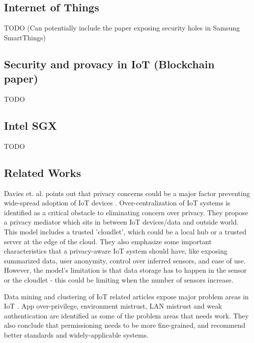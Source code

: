 \subsection{Internet of Things}
TODO
(Can potentially include the paper exposing security holes in Samsung SmartThings)

\subsection{Security and provacy in IoT (Blockchain paper)}
TODO

\subsection{Intel SGX}
TODO

\subsection{Related Works}
Davies et. al. points out that privacy concerns could be a major factor preventing wide-spread adoption of IoT devices \cite{davies}. Over-centralization of IoT systems is identified as a critical obstacle to eliminating concern over privacy. They propose a privacy mediator which sits in between IoT devices/data and outside world. This model includes a trusted 'cloudlet', which could be a local hub or a trusted server at the edge of the cloud. They also emphasize some important characteristics that a privacy-aware IoT system should have, like exposing summarized data, user anonymity, control over inferred sensors, and ease of use. However, the model's limitation is that data storage has to happen in the sensor or the cloudlet - this could be limiting when the number of sensors increase.

Data mining and clustering of IoT related articles expose major problem areas in IoT \cite{zhang}. App over-privilege, environment mistrust, LAN mistrust and weak authentication are identified as some of the problem areas that needs work. They also conclude that permissioning needs to be more fine-grained, and recommend better standards and widely-applicable systems.